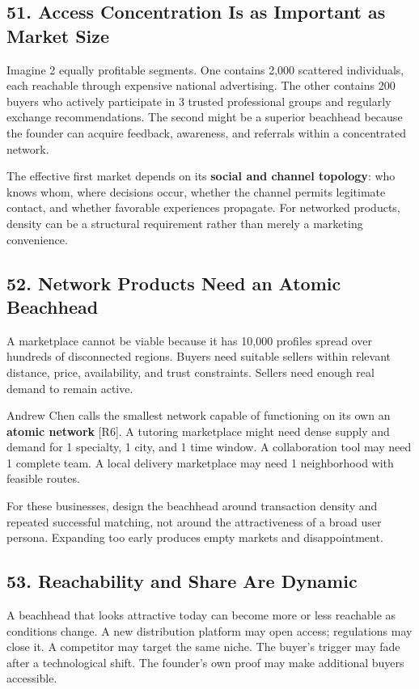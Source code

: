 \subsection*{51. Access Concentration Is as Important as Market Size}

Imagine 2 equally profitable segments. One contains 2,000 scattered individuals, each reachable through expensive national advertising. The other contains 200 buyers who actively participate in 3 trusted professional groups and regularly exchange recommendations. The second might be a superior beachhead because the founder can acquire feedback, awareness, and referrals within a concentrated network.

The effective first market depends on its \textbf{social and channel topology}: who knows whom, where decisions occur, whether the channel permits legitimate contact, and whether favorable experiences propagate. For networked products, density can be a structural requirement rather than merely a marketing convenience.

\subsection*{52. Network Products Need an Atomic Beachhead}

A marketplace cannot be viable because it has 10,000 profiles spread over hundreds of disconnected regions. Buyers need suitable sellers within relevant distance, price, availability, and trust constraints. Sellers need enough real demand to remain active.

Andrew Chen calls the smallest network capable of functioning on its own an \textbf{atomic network} [R6]. A tutoring marketplace might need dense supply and demand for 1 specialty, 1 city, and 1 time window. A collaboration tool may need 1 complete team. A local delivery marketplace may need 1 neighborhood with feasible routes.

For these businesses, design the beachhead around transaction density and repeated successful matching, not around the attractiveness of a broad user persona. Expanding too early produces empty markets and disappointment.

\subsection*{53. Reachability and Share Are Dynamic}

A beachhead that looks attractive today can become more or less reachable as conditions change. A new distribution platform may open access; regulations may close it. A competitor may target the same niche. The buyer's trigger may fade after a technological shift. The founder's own proof may make additional buyers accessible.

